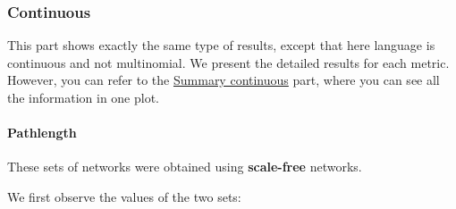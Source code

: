 \documentclass[
]{article}
\begin{document}
\hypertarget{continuous-1}{%
\subsubsection{Continuous}\label{continuous-1}}

This part shows exactly the same type of results, except that here
language is continuous and not multinomial. We present the detailed
results for each metric. However, you can refer to the
\protect\hyperlink{summary-continuous}{Summary continuous} part, where
you can see all the information in one plot.

\hypertarget{pathlength-1}{%
\paragraph{Pathlength}\label{pathlength-1}}

These sets of networks were obtained using \textbf{scale-free} networks.

We first observe the values of the two sets:
\end{document}
